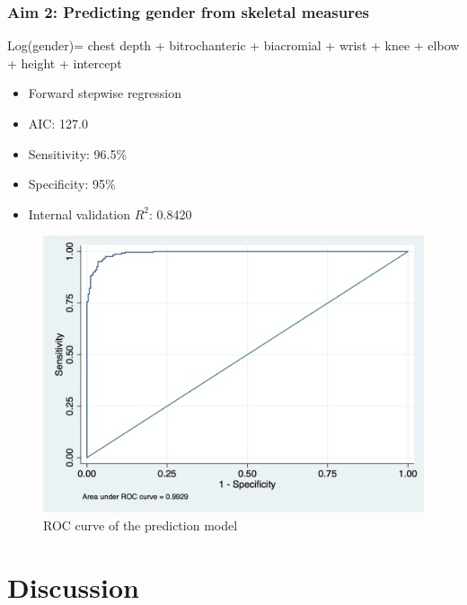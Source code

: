 \documentclass{beamer}
\begin{document}
\begin{frame}
\frametitle{Aim 2: Predicting gender from skeletal measures}

Log(gender)= chest depth + bitrochanteric + biacromial + wrist + knee + elbow + height + intercept

\begin{itemize}
	\item Forward stepwise regression 
	\item AIC: 127.0
	\item Sensitivity: 96.5\%
	\item Specificity: 95\%
	\item Internal validation $R^2$: 0.8420
\end{itemize}

\end{frame}
\begin{figure}
	\includegraphics[scale=0.35]{Figure1.png}
	\caption{ROC curve of the prediction model}
	\label{fig:figure1}
\end{figure}

\section{Discussion}
\end{document}

